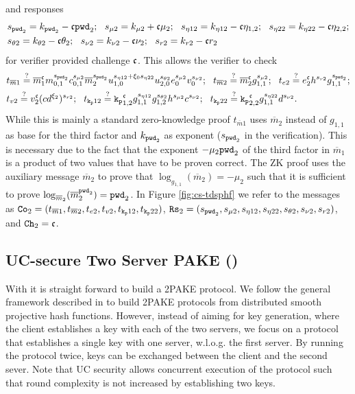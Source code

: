 and responses
\begin{align*}
  & s_{\mathtt{pwd}_2} = k_{\mathtt{pwd}_2} - \mathfrak{c}\mathtt{pwd}_2; ~~ s_{\mu2} = k_{\mu2} + \mathfrak{c}\mu_2; ~~ s_{\eta12} = k_{\eta12} - \mathfrak{c}\eta_{1,2}; ~~ s_{\eta22} = k_{\eta22} - \mathfrak{c}\eta_{2,2}; \\
  & s_{\theta2} = k_{\theta2} - \mathfrak{c}\theta_2; ~~ s_{\nu2} = k_{\nu2} - \mathfrak{c}\nu_2; ~~ s_{r2} = k_{r2} - \mathfrak{c} r_2
\end{align*}
for verifier provided challenge $\mathfrak{c}$.
This allows the verifier to check
\begin{align*}
  & t_{\overline{m}1} \stackrel{?}{=} \overline{m}_1^\mathfrak{c} m_{0,1}^{s_{\mathtt{pwd}_2}} c_{0,1}^{s_{\mu2}} \overline{m}_{2}^{s_{\mathtt{pwd}_2}} u_{1,0}^{s_{\eta12} + \xi_0 s_{\eta22}} u_{2,0}^{s_{\theta2}} e_0^{s_{\mu2}} v_0^{s_{\nu2}}; ~~ 
    t_{\overline{m}2} \stackrel{?}{=} \overline{m}_2^\mathfrak{c} g_{1,1}^{s_{\mu2}}; ~~  t_{e2} \stackrel{?}{=} e_2^\mathfrak{c} h^{s_{r2}}g_{1,1}^{s_{\mathtt{pwd}_2}}; \\
  & t_{v2} \stackrel{?}{=} v_2^\mathfrak{c} (cd^{\xi_2})^{s_{r2}}; ~~
    t_{\mathtt{k_p}12} \stackrel{?}{=} \mathtt{k_p}_{1,2}^\mathfrak{c} g_{1,1}^{s_{\eta12}} g_{1,2}^{s_{\theta2}} h^{s_{\mu2}} c^{s_{\nu2}}; ~~ 
    t_{\mathtt{k_p}22} \stackrel{?}{=} \mathtt{k_p}_{2,2}^\mathfrak{c} g_{1,1}^{s_{\eta22}} d^{s_{\nu2}} .
\end{align*}
While this is mainly a standard zero-knowledge proof $t_{\overline{m}1}$ uses $\overline{m}_2$ instead of $g_{1,1}$ as base for the third factor and $k_{\mathtt{pwd}_2}$ as exponent ($s_{\mathtt{pwd}_2}$ in the verification).
This is necessary due to the fact that the exponent $-\mu_2 {\mathtt{pwd}_2}$ of the third factor in $\overline{m}_1$ is a product of two values that have to be proven correct.
The ZK proof uses the auxiliary message $\overline{m}_2$ to prove that $\log_{g_{1,1}}(\overline{m}_2)=-\mu_2$ such that it is sufficient to prove $\log_{\overline{m}_2}(\overline{m}_2^{{\mathtt{pwd}_2}})={\mathtt{pwd}_2}$.
In Figure \ref{fig:cs-tdsphf} we refer to the messages as $\mathtt{Co}_{2}=(t_{\overline{m}1}, t_{\overline{m}2}, t_{e2}, t_{v2}, t_{\mathtt{k_p}12}, t_{\mathtt{k_p}22})$, $\mathtt{Rs}_{2}=(s_{\mathtt{pwd}_2}, s_{\mu2}, s_{\eta12}, s_{\eta22}, s_{\theta2}, s_{\nu2}, s_{r2})$, and $\mathtt{Ch}_{2}=\mathfrak{c}$.


\subsection{UC-secure Two Server PAKE (\FTWOPAKE)}\label{sec:2pake}
With \TDSPHF it is straight forward to build a 2PAKE protocol.
We follow the general framework described in \cite{KieferM14a} to build 2PAKE protocols from distributed smooth projective hash functions.
However, instead of aiming for key generation, where the client establishes a key with each of the two servers, we focus on a protocol that establishes a single key with one server, w.l.o.g. the first server.
By running the protocol twice, keys can be exchanged between the client and the second sever.
Note that UC security allows concurrent execution of the protocol such that round complexity is not increased by establishing two keys.

